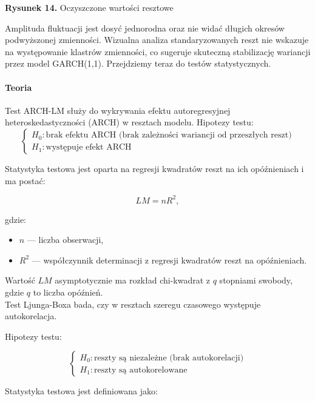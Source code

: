 \documentclass{article}
\begin{document}
{\begin{center}
  \vspace{0.5em} %

  {\small \textbf{Rysunek 14.} Oczyszczone wartości resztowe}
\end{center}

Amplituda fluktuacji jest dosyć jednorodna oraz nie widać długich okresów podwyższonej zmienności. Wizualna analiza standaryzowanych reszt nie wskazuje na występowanie klastrów zmienności, co sugeruje skuteczną stabilizację wariancji przez model GARCH(1,1). Przejdziemy teraz do testów statystycznych. 

\paragraph{Teoria}
 Test ARCH-LM służy do wykrywania efektu autoregresyjnej heteroskedastyczności (ARCH) w resztach modelu.  
Hipotezy testu:
\[
\begin{cases}
H_0: \text{brak efektu ARCH (brak zależności wariancji od przeszłych reszt)} \\
H_1: \text{występuje efekt ARCH}
\end{cases}
\]

Statystyka testowa jest oparta na regresji kwadratów reszt na ich opóźnieniach i ma postać:

\[
LM = n R^2,
\]

gdzie:

\begin{itemize}
    \item \( n \) — liczba obserwacji,
    \item \( R^2 \) — współczynnik determinacji z regresji kwadratów reszt na opóźnieniach.
\end{itemize}

Wartość \(LM\) asymptotycznie ma rozkład chi-kwadrat z \(q\) stopniami swobody, gdzie \(q\) to liczba opóźnień. \\

 Test Ljunga-Boxa bada, czy w resztach szeregu czasowego występuje autokorelacja.

Hipotezy testu:

\[
\begin{cases}
H_0: \text{reszty są niezależne (brak autokorelacji)} \\
H_1: \text{reszty są autokorelowane}
\end{cases}
\]

Statystyka testowa jest definiowana jako:

}
\end{document}
